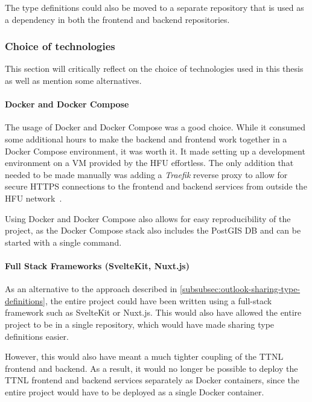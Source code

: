 The type definitions could also be moved to a separate repository that is used as a dependency in both the frontend and backend repositories.

\subsubsection{Choice of technologies}

This section will critically reflect on the choice of technologies used in this thesis as well as mention some alternatives.

\paragraph{Docker and Docker Compose}

The usage of Docker and Docker Compose was a good choice.
While it consumed some additional hours to make the backend and frontend work together in a Docker Compose environment, it was worth it.
It made setting up a development environment on a \ac{VM} provided by the \ac{HFU} effortless.
The only addition that needed to be made manually was adding a \emph{Traefik} reverse proxy to allow for secure \ac{HTTPS} connections to the frontend and backend services from outside the \ac{HFU} network~\cite{traefik_labs_traefik_2023}.

Using Docker and Docker Compose also allows for easy reproducibility of the project, as the Docker Compose stack also includes the PostGIS \ac{DB} and can be started with a single command.

\paragraph{Full Stack Frameworks (SvelteKit, Nuxt.js)}

As an alternative to the approach described in \cref{subsubsec:outlook-sharing-type-definitions}, the entire project could have been written using a full-stack framework such as SvelteKit or Nuxt.js.
This would also have allowed the entire project to be in a single repository, which would have made sharing type definitions easier.

However, this would also have meant a much tighter coupling of the \ac{TTNL} frontend and backend.
As a result, it would no longer be possible to deploy the \ac{TTNL} frontend and backend services separately as Docker containers, since the entire project would have to be deployed as a single Docker container.

